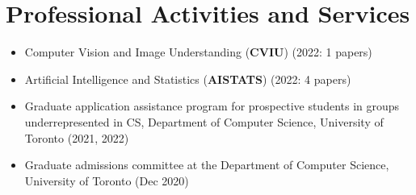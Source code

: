 \section*{Professional Activities and Services}
\vspace{\postsubhead}
\begin{adjustwidth}{\indentleft}{\indentright}
  \begin{itemize}
    \item Computer Vision and Image Understanding (\textbf{CVIU}) (2022: 1 papers)
    \item Artificial Intelligence and Statistics (\textbf{AISTATS}) (2022: 4 papers)
    \item Graduate application assistance program for prospective students in groups underrepresented in CS, Department of Computer Science, University of Toronto (2021, 2022)
    \item Graduate admissions committee at the Department of Computer Science, University of Toronto (Dec 2020)
    
  \end{itemize}
\end{adjustwidth}
